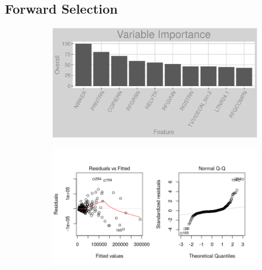 \subsection{Forward Selection}
\label{appendix:district_heat:lp}
\begin{figure}[h]
\centering
\begin{subfigure}{1\textwidth}
\centering
\includegraphics[width=.99\textwidth, height=0.3\textheight]{Images/district_heat_lp_vars.png}
\end{subfigure}
\begin{subfigure}{1\textwidth}
\centering
\includegraphics[width=.99\textwidth, height=0.475\textheight]{Images/district_heat_lp_res_1.png}
\end{subfigure}
\end{figure}
\FloatBarrier
\newpage

